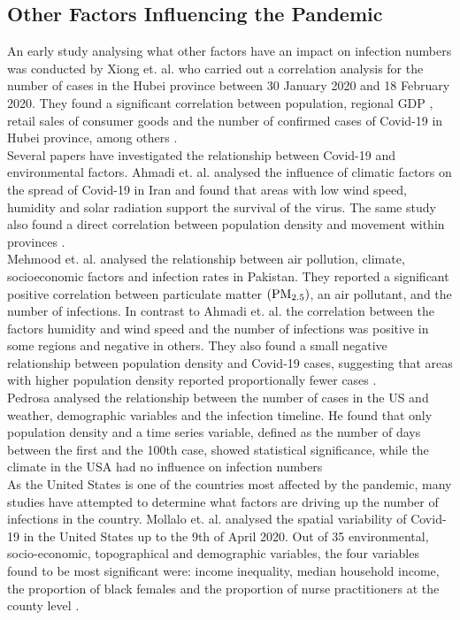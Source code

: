 \subsection*{Other Factors Influencing the Pandemic}
An early study analysing what other factors have an impact on infection numbers was conducted by Xiong et. al. who carried out a correlation analysis for the number of cases in the Hubei province between 30 January 2020 and 18 February 2020. They found a significant correlation between population, regional GDP , retail sales of consumer goods and the number of confirmed cases of Covid-19 in Hubei province, among others \autocite[][]{xiong2020spatial}. \\
Several papers have investigated the relationship between Covid-19 and environmental factors. Ahmadi et. al. analysed the influence of climatic factors on the spread of Covid-19 in Iran and found that areas with low wind speed, humidity and solar radiation support the survival of the virus. The same study also found a direct correlation between population density and movement within provinces \autocite[][]{ahmadi2020investigation}. \\
Mehmood et. al. analysed the relationship between air pollution, climate, socioeconomic factors and infection rates in Pakistan. They reported a significant positive correlation between particulate matter $\left(\hbox{PM}_{2.5}\right)$, an air pollutant, and the number of infections. In contrast to Ahmadi et. al. the correlation between the factors humidity and wind speed and the number of infections was positive in some regions and negative in others. They also found a small negative relationship between population density and Covid-19 cases, suggesting that areas with higher population density reported proportionally fewer cases \autocite[][]{mehmood2021spatiotemporal}. \\
Pedrosa analysed the relationship between the number of cases in the US and weather, demographic variables and the infection timeline. He found that only population density and a time series variable, defined as the number of days between the first and the 100th case, showed statistical significance, while the climate in the USA had no influence on infection numbers \autocite[][]{pedrosa2020dynamics} \\
As the United States is one of the countries most affected by the pandemic, many studies have attempted to determine what factors are driving up the number of infections in the country. Mollalo et. al. analysed the spatial variability of Covid-19 in the United States up to the 9th of April 2020. Out of 35 environmental, socio-economic, topographical and demographic variables, the four variables found to be most significant were: income inequality, median household income, the proportion of black females and the proportion of nurse practitioners at the county level \autocite[][]{mollalo2020gis}. \\
